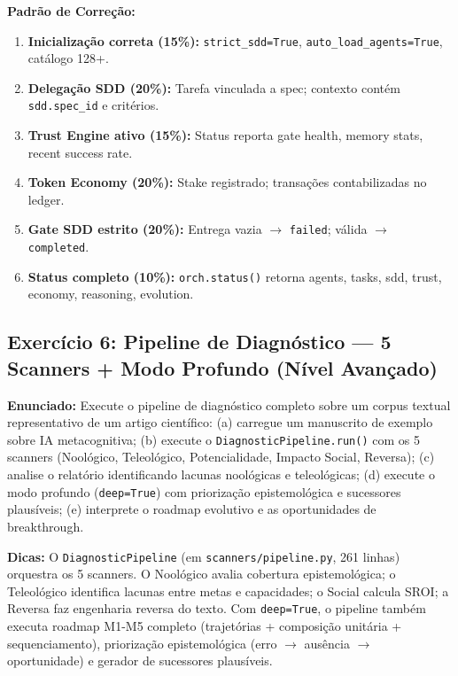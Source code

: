 \textbf{Padrão de Correção:}
\begin{enumerate}
  \item \textbf{Inicialização correta (15\%):} \texttt{strict\_sdd=True}, \texttt{auto\_load\_agents=True}, catálogo 128+.
  \item \textbf{Delegação SDD (20\%):} Tarefa vinculada a spec; contexto contém \texttt{sdd.spec\_id} e critérios.
  \item \textbf{Trust Engine ativo (15\%):} Status reporta gate health, memory stats, recent success rate.
  \item \textbf{Token Economy (20\%):} Stake registrado; transações contabilizadas no ledger.
  \item \textbf{Gate SDD estrito (20\%):} Entrega vazia $\to$ \texttt{failed}; válida $\to$ \texttt{completed}.
  \item \textbf{Status completo (10\%):} \texttt{orch.status()} retorna agents, tasks, sdd, trust, economy, reasoning, evolution.
\end{enumerate}

\subsection{Exercício 6: Pipeline de Diagnóstico — 5 Scanners + Modo Profundo (Nível Avançado)}
\label{sec:ex6}

\textbf{Enunciado:} Execute o pipeline de diagnóstico completo sobre um corpus textual representativo de um artigo científico: (a) carregue um manuscrito de exemplo sobre IA metacognitiva; (b) execute o \texttt{DiagnosticPipeline.run()} com os 5 scanners (Noológico, Teleológico, Potencialidade, Impacto Social, Reversa); (c) analise o relatório identificando lacunas noológicas e teleológicas; (d) execute o modo profundo (\texttt{deep=True}) com priorização epistemológica e sucessores plausíveis; (e) interprete o roadmap evolutivo e as oportunidades de breakthrough.

\textbf{Dicas:} O \texttt{DiagnosticPipeline} (em \texttt{scanners/pipeline.py}, 261 linhas) orquestra os 5 scanners. O Noológico avalia cobertura epistemológica; o Teleológico identifica lacunas entre metas e capacidades; o Social calcula SROI; a Reversa faz engenharia reversa do texto. Com \texttt{deep=True}, o pipeline também executa roadmap M1-M5 completo (trajetórias + composição unitária + sequenciamento), priorização epistemológica (erro $\to$ ausência $\to$ oportunidade) e gerador de sucessores plausíveis.

